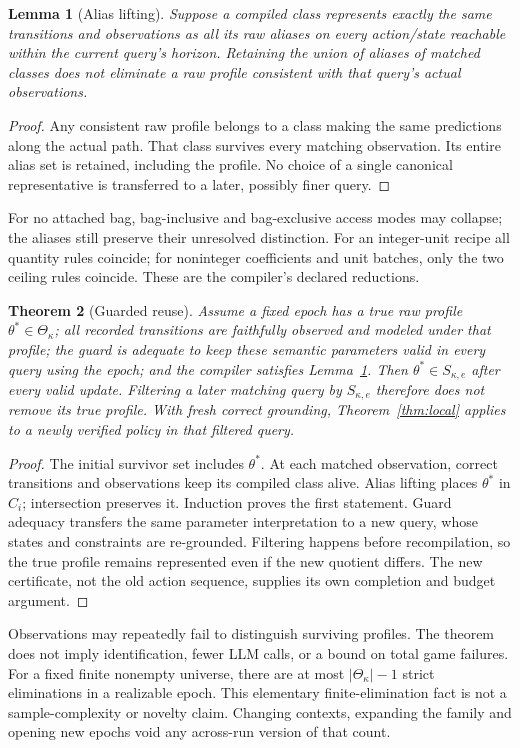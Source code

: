 \documentclass[11pt]{article}
\newtheorem{theorem}{Theorem}[section]
\newtheorem{lemma}[theorem]{Lemma}
\theoremstyle{definition}
\begin{document}
\begin{lemma}[Alias lifting]\label{lem:alias}
Suppose a compiled class represents exactly the same transitions and observations
as all its raw aliases on every action/state reachable within the current
query's horizon. Retaining the union of aliases of matched classes does not
eliminate a raw profile consistent with that query's actual observations.
\end{lemma}
\begin{proof}
Any consistent raw profile belongs to a class making the same predictions along
the actual path. That class survives every matching observation. Its entire
alias set is retained, including the profile. No choice of a single canonical
representative is transferred to a later, possibly finer query.
\end{proof}
For no attached bag, bag-inclusive and bag-exclusive access modes may collapse;
the aliases still preserve their unresolved distinction. For an integer-unit
recipe all quantity rules coincide; for noninteger coefficients and unit batches,
only the two ceiling rules coincide. These are the compiler's declared reductions.

\begin{theorem}[Guarded reuse]\label{thm:reuse}
Assume a fixed epoch has a true raw profile $\theta^*\in\Theta_\kappa$; all
recorded transitions are faithfully observed and modeled under that profile;
the guard is adequate to keep these semantic parameters valid in every query
using the epoch; and the compiler satisfies Lemma~\ref{lem:alias}. Then
$\theta^*\in S_{\kappa,e}$ after every valid update. Filtering a later matching
query by $S_{\kappa,e}$ therefore does not remove its true profile. With fresh
correct grounding, Theorem~\ref{thm:local} applies to a newly verified policy in
that filtered query.
\end{theorem}
\begin{proof}
The initial survivor set includes $\theta^*$. At each matched observation,
correct transitions and observations keep its compiled class alive. Alias
lifting places $\theta^*$ in $C_i$; intersection preserves it. Induction proves
the first statement. Guard adequacy transfers the same parameter interpretation
to a new query, whose states and constraints are re-grounded. Filtering happens
before recompilation, so the true profile remains represented even if the new
quotient differs. The new certificate, not the old action sequence, supplies
its own completion and budget argument.
\end{proof}
Observations may repeatedly fail to distinguish surviving profiles. The theorem
does not imply identification, fewer LLM calls, or a bound on total game failures.
For a fixed finite nonempty universe, there are at most $|\Theta_\kappa|-1$
strict eliminations in a realizable epoch. This elementary finite-elimination
fact is not a sample-complexity or novelty claim. Changing contexts, expanding
the family and opening new epochs void any across-run version of that count.
\end{document}
